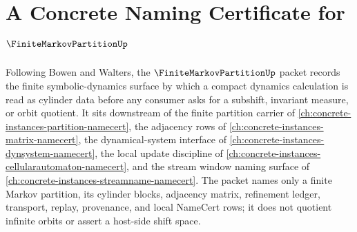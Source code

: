 \chapter{A Concrete Naming Certificate for $\FiniteMarkovPartitionUp$}
\label{ch:concrete-instances-finite-markov-partition-namecert}

Following Bowen and Walters, the $\FiniteMarkovPartitionUp$ packet records the finite symbolic-dynamics surface by which a compact dynamics calculation is read as cylinder data before any consumer asks for a subshift, invariant measure, or orbit quotient. It sits downstream of the finite partition carrier of \autoref{ch:concrete-instances-partition-namecert}, the adjacency rows of \autoref{ch:concrete-instances-matrix-namecert}, the dynamical-system interface of \autoref{ch:concrete-instances-dynsystem-namecert}, the local update discipline of \autoref{ch:concrete-instances-cellularautomaton-namecert}, and the stream window naming surface of \autoref{ch:concrete-instances-streamname-namecert}. The packet names only a finite Markov partition, its cylinder blocks, adjacency matrix, refinement ledger, transport, replay, provenance, and local NameCert rows; it does not quotient infinite orbits or assert a host-side shift space.

